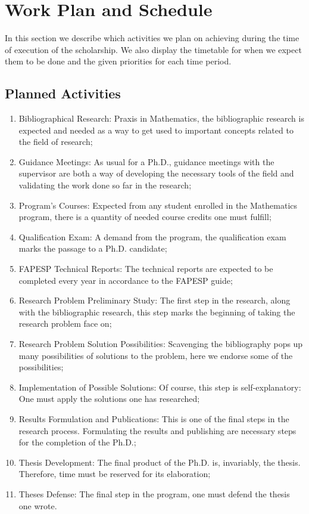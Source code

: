 
\section{Work Plan and Schedule}

In this section we describe which activities we plan on achieving during the time of execution of the scholarship. We also display the timetable for when we expect them to be done and the given priorities for each time period.

\subsection{Planned Activities}

\begin{enumerate}
	\item Bibliographical Research: Praxis in Mathematics, the bibliographic research is expected and needed as a way to get used to important concepts related to the field of research;
	\item Guidance Meetings: As usual for a Ph.D., guidance meetings with the supervisor are both a way of developing the necessary tools of the field and validating the work done so far in the research;
	\item Program's Courses: Expected from any student enrolled in the Mathematics program, there is a quantity of needed course credits one must fulfill;
	\item Qualification Exam: A demand from the program, the qualification exam marks the passage to a Ph.D. candidate;
	\item FAPESP Technical Reports: The technical reports are expected to be completed every year in accordance to the FAPESP guide;
	\item Research Problem Preliminary Study: The first step in the research, along with the bibliographic research, this step marks the beginning of taking the research problem face on;
	\item Research Problem Solution Possibilities: Scavenging the bibliography pops up many possibilities of solutions to the problem, here we endorse some of the possibilities;
	\item Implementation of Possible Solutions: Of course, this step is self-explanatory: One must apply the solutions one has researched;
	\item Results Formulation and Publications: This is one of the final steps in the research process. Formulating the results and publishing are necessary steps for the completion of the Ph.D.;
	\item Thesis Development: The final product of the Ph.D. is, invariably, the thesis. Therefore, time must be reserved for its elaboration;
	\item Theses Defense: The final step in the program, one must defend the thesis one wrote.
\end{enumerate}


